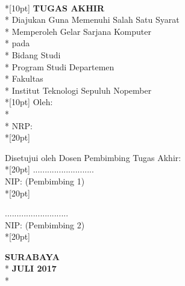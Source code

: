 \newpage
	\thispagestyle{plain}		
	\begin{centering}
		\textbf{\MakeUppercase{\judul}} \\*[10pt]
		\textbf{\large{TUGAS AKHIR}} \\*
		Diajukan Guna Memenuhi Salah Satu Syarat \\*
		Memperoleh Gelar Sarjana Komputer \\*
		pada \\*
		Bidang Studi \bidangStudi \\*
		Program Studi \prodi Departemen \jurusan \\*
		Fakultas \fakultas \\*
		Institut Teknologi Sepuluh Nopember \\*[10pt]
		Oleh: \\*
		\textbf{\penulis} \\*
		NRP: \nrp \\*[20pt]
	\end{centering}

	{\noindent Disetujui oleh Dosen Pembimbing Tugas Akhir:}\\*[20pt]         \pembimbingSatu \hfill \hfill .......................... \\
		NIP: \nipPembimbingSatu \hfill \hfill (Pembimbing 1) \\*[20pt]
		
	{\noindent \pembimbingDua  \hfill \hfill ...........................}  \\
	NIP: \nipPembimbingDua \hfill \hfill (Pembimbing 2) \\*[20pt] 

	\begin{centering}
		\textbf{SURABAYA} \\*
		\textbf{JULI 2017} \\*
	\end{centering}
	\cleardoublepage
